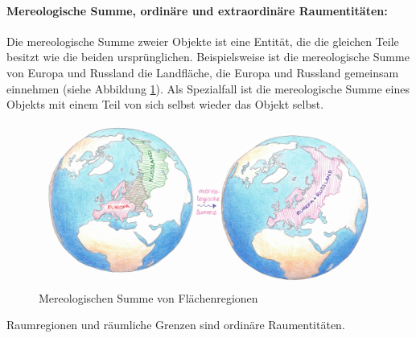     \paragraph{Mereologische Summe, ordinäre und extraordinäre Raumentitäten:}
        Die
        mereologische Summe zweier Objekte ist eine Entität, die die gleichen Teile besitzt wie die beiden ursprünglichen.
        Beispielsweise ist die mereologische Summe von Europa und Russland die Landfläche, die Europa und Russland gemeinsam einnehmen (siehe Abbildung \ref{fig:mereologische-summe}).
        Als Spezialfall ist die mereologische Summe eines Objekts mit einem Teil von sich selbst wieder das Objekt selbst.
        \begin{figure}[ht]
            \centering
            \includegraphics[width=\textwidth]{abb/mereologische-summe.png}
            \caption{Mereologischen Summe von Flächenregionen}
            \label{fig:mereologische-summe}
        \end{figure}
		Raumregionen und räumliche Grenzen sind ordinäre Raumentitäten.
